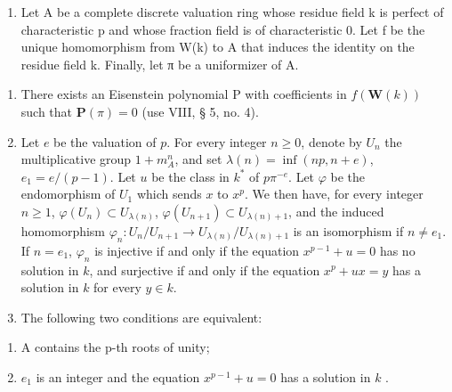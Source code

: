 \begin{enumerate}
\def\labelenumi{\arabic{enumi})}
\setcounter{enumi}{16}
\tightlist
\item
  Let A be a complete discrete valuation ring whose residue field k is perfect of characteristic p and whose fraction field is of characteristic 0. Let f be the unique homomorphism from W(k) to A that induces the identity on the residue field k. Finally, let π be a uniformizer of A.
\end{enumerate}

\begin{enumerate}
\def\labelenumi{\alph{enumi})}
\item
  There exists an Eisenstein polynomial P with coefficients in \(f(\mathbf{W}(k))\) such that \(\mathbf{P}(\pi)=0\) (use VIII, § 5, no. 4).
\item
  Let \(e\) be the valuation of \(p\). For every integer \(n \geqslant 0\), denote by \(U_n\) the multiplicative group \(1 + m_A^n\), and set \(\lambda(n) = \inf(np, n + e)\), \(e_1 = e/(p - 1)\). Let \(u\) be the class in \(k^*\) of \(p\pi^{-e}\). Let \(\varphi\) be the endomorphism of \(U_1\) which sends \(x\) to \(x^p\). We then have, for every integer \(n \geqslant 1\), \(\varphi(U_n) \subset U_{\lambda(n)}\), \(\varphi(U_{n+1}) \subset U_{\lambda(n)+1}\), and the induced homomorphism \(\varphi_n: U_n/U_{n+1} \to U_{\lambda(n)}/U_{\lambda(n)+1}\) is an isomorphism if \(n \neq e_1\). If \(n = e_1\), \(\varphi_n\) is injective if and only if the equation \(x^{p-1} + u = 0\) has no solution in \(k\), and surjective if and only if the equation \(x^p + ux = y\) has a solution in \(k\) for every \(y \in k\).
\item
  The following two conditions are equivalent:
\end{enumerate}

\begin{enumerate}
\def\labelenumi{(\roman{enumi})}
\item
  A contains the p-th roots of unity;
\item
  \(e_1\) is an integer and the equation \(x^{p - 1} + u = 0\) has a solution in \(k\) .
\end{enumerate}

